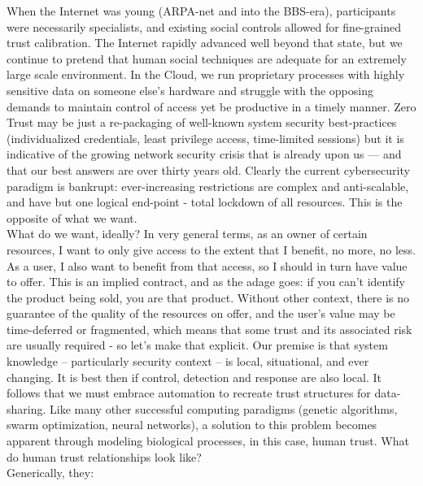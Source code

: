 When the Internet was young (ARPA-net and into the BBS-era), participants were necessarily specialists, and existing social controls allowed for fine-grained trust calibration.
The Internet rapidly advanced well beyond that state, but we continue to pretend that human social techniques are adequate for an extremely large scale environment.
In the Cloud, we run proprietary processes with highly sensitive data on someone else's hardware and struggle with the opposing demands to maintain control of access yet be productive in a timely manner.
Zero Trust may be just a re-packaging of well-known system security best-practices (individualized credentials, least privilege access, time-limited sessions) but it is indicative of the growing network security crisis that is already upon us --- and that our best answers are over thirty years old.
Clearly the current cybersecurity paradigm is bankrupt: ever-increasing restrictions are complex and anti-scalable, and have but one logical end-point - total lockdown of all resources.
This is the opposite of what we want.
\\[10pt]
What do we want, ideally?
In very general terms, as an owner of certain resources, I want to only give access to the extent that I benefit, no more, no less.
As a user, I also want to benefit from that access, so I should in turn have value to offer.
This is an implied contract, and as the adage goes: if you can't identify the product being sold, you are that product.
Without other context, there is no guarantee of the quality of the resources on offer, and the user's value may be time-deferred or fragmented, which means that some trust and its associated risk are usually required - so let's make that explicit.
Our premise is that system knowledge -- particularly security context -- is local, situational, and ever changing.
It is best then if control, detection and response are also local.
It follows that we must embrace automation to recreate trust structures for data-sharing.
Like many other successful computing paradigms (genetic algorithms, swarm optimization, neural networks), a solution to this problem becomes apparent through modeling biological processes, in this case, human trust.
What do human trust relationships look like?
\\Generically, they:
